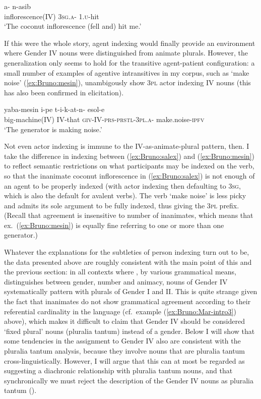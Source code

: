 \documentclass[output=collectionpaper]{langsci/langscibook}
\begin{document}
\ea\label{ex:Bruno:salex}
 a- n-asib\\
inflorescence(IV) 3\textsc{sg}.\textsc{a}- 1.\textsc{u}-hit\\
\glt `The coconut inflorescence (fell and) hit me.'
\z

\noindent If this were the whole story, agent indexing would finally provide an environment where Gender IV nouns were distinguished from animate plurals. However, the generalization only seems to hold for the transitive agent-patient configuration: a small number of examples of agentive intransitives in my corpus, such as  `make noise' (\ref{ex:Bruno:mesin}), unambigously show 3\textsc{pl} actor indexing IV nouns (this has also been confirmed in elicitation).

\ea\label{ex:Bruno:mesin}
\gll yaba-mesin i-pe t-i-k-at-n- esol-e\\
big-machine(IV) IV-that \textsc{giv}-IV-\textsc{prs}-\textsc{prstl}-3\textsc{pl}.\textsc{a}- make.noise-\textsc{ipfv} \\
\glt `The generator is making noise.'
\z

\noindent Not even actor indexing is immune to the IV-as-animate-plural pattern, then. I take the difference in indexing between (\ref{ex:Bruno:salex}) and (\ref{ex:Bruno:mesin}) to reflect semantic restrictions on what participants may be indexed on the verb, so that the inanimate coconut inflorescence in (\ref{ex:Bruno:salex}) is not enough of an agent to be properly indexed (with actor indexing then defaulting to 3\textsc{sg}, which is also the default for avalent verbs). The verb  `make noise' is less picky and admits its sole argument to be fully indexed, thus giving the 3\textsc{pl} prefix. (Recall that agreement is insensitive to number of inanimates, which means that ex.~(\ref{ex:Bruno:mesin}) is equally fine referring to one or more than one generator.)

Whatever the explanations for the subtleties of person indexing turn out to be, the data presented above are roughly consistent with the main point of this and the previous section: in all contexts where , by various grammatical means, distinguishes between gender, number and animacy, nouns of Gender IV systematically pattern with plurals of Gender I and II. This is quite strange given the fact that inanimates do not show grammatical agreement according to their referential cardinality in the language (cf.\ example (\ref{ex:Bruno:Mar-intro3}) above), which makes it difficult to claim that Gender IV should be considered `fixed plural' nouns (pluralia tantum) instead of a gender. Below I will show that some tendencies in the assignment to Gender IV also are consistent with the pluralia tantum analysis, because they involve nouns that are pluralia tantum cross-linguistically. However, I will argue that this can at most be regarded as suggesting a diachronic relationship with pluralia tantum nouns, and that synchronically we must reject the description of the Gender IV nouns as pluralia tantum ().
\end{document}

